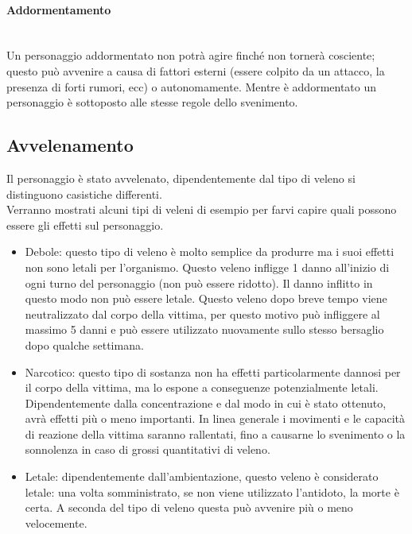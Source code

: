 \documentclass[../manuale_main.tex]{subfiles}
\begin{document}
\paragraph{Addormentamento}\mbox{}\\
Un personaggio addormentato non potrà agire finché non tornerà cosciente; questo può avvenire a causa di fattori esterni (essere colpito da un attacco, la presenza di forti rumori, ecc) o autonomamente. Mentre è addormentato un personaggio è sottoposto alle stesse regole dello svenimento.
\clearpage
\subsection{Avvelenamento} 
Il personaggio è stato avvelenato, dipendentemente dal tipo di veleno si distinguono casistiche differenti.\\
Verranno mostrati alcuni tipi di veleni di esempio per farvi capire quali possono essere gli effetti sul personaggio.
\begin{itemize}
\item Debole: questo tipo di veleno è molto semplice da produrre ma i suoi effetti non sono letali per l’organismo. Questo veleno infligge 1 danno all’inizio di ogni turno del personaggio (non può essere ridotto). Il danno inflitto in questo modo non può essere letale. Questo veleno dopo breve tempo viene neutralizzato dal corpo della vittima, per questo motivo può infliggere al massimo 5 danni e può essere utilizzato nuovamente sullo stesso bersaglio dopo qualche settimana.
\item Narcotico: questo tipo di sostanza non ha effetti particolarmente dannosi per il corpo della vittima, ma lo espone a conseguenze potenzialmente letali. Dipendentemente dalla concentrazione e dal modo in cui è stato ottenuto, avrà effetti più o meno importanti. In linea generale i movimenti e le capacità di reazione della vittima saranno rallentati, fino a causarne lo svenimento o la sonnolenza in caso di grossi quantitativi di veleno. 
\item Letale: dipendentemente dall’ambientazione, questo veleno è considerato letale: una volta somministrato, se non viene utilizzato l’antidoto, la morte è certa. A seconda del tipo di veleno questa può avvenire più o meno velocemente.
\end{itemize}
\end{document}

